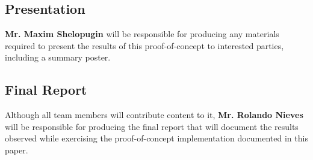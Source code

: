\documentclass[conference]{sig-alternate-05-2015}
\begin{document}
\subsection{Presentation}\label{sec:presentation_task}
\textbf{Mr. Maxim Shelopugin} will be responsible for producing any materials
required to present the results of this proof-of-concept to interested parties,
including a summary poster.

\subsection{Final Report}\label{sec:report_task}
Although all team members will contribute content to it,
\textbf{Mr. Rolando Nieves} will be responsible for producing the final report
that will document the results observed while exercising the proof-of-concept
implementation documented in this paper.



\end{document}
